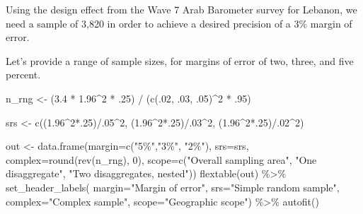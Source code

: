 \documentclass[
  letterpaper,
  DIV=11,
  numbers=noendperiod]{scrreprt}
\newenvironment{Shaded}{\begin{snugshade}}{\end{snugshade}}
\newcommand{\AttributeTok}[1]{\textcolor[rgb]{0.40,0.45,0.13}{#1}}
\newcommand{\DecValTok}[1]{\textcolor[rgb]{0.68,0.00,0.00}{#1}}
\newcommand{\FloatTok}[1]{\textcolor[rgb]{0.68,0.00,0.00}{#1}}
\newcommand{\FunctionTok}[1]{\textcolor[rgb]{0.28,0.35,0.67}{#1}}
\newcommand{\NormalTok}[1]{\textcolor[rgb]{0.00,0.23,0.31}{#1}}
\newcommand{\OtherTok}[1]{\textcolor[rgb]{0.00,0.23,0.31}{#1}}
\newcommand{\SpecialCharTok}[1]{\textcolor[rgb]{0.37,0.37,0.37}{#1}}
\newcommand{\StringTok}[1]{\textcolor[rgb]{0.13,0.47,0.30}{#1}}
\begin{document}
Using the design effect from the Wave 7 Arab Barometer survey for
Lebanon, we need a sample of 3,820 in order to achieve a desired
precision of a 3\% margin of error.

Let's provide a range of sample sizes, for margins of error of two,
three, and five percent.

\begin{Shaded}
\begin{Highlighting}[]
\NormalTok{n\_rng }\OtherTok{\textless{}{-}}\NormalTok{ (}\FloatTok{3.4} \SpecialCharTok{*} \FloatTok{1.96}\SpecialCharTok{\^{}}\DecValTok{2} \SpecialCharTok{*}\NormalTok{ .}\DecValTok{25}\NormalTok{) }\SpecialCharTok{/}\NormalTok{ (}\FunctionTok{c}\NormalTok{(.}\DecValTok{02}\NormalTok{, .}\DecValTok{03}\NormalTok{, .}\DecValTok{05}\NormalTok{)}\SpecialCharTok{\^{}}\DecValTok{2} \SpecialCharTok{*}\NormalTok{ .}\DecValTok{95}\NormalTok{)}

\NormalTok{srs }\OtherTok{\textless{}{-}} \FunctionTok{c}\NormalTok{((}\FloatTok{1.96}\SpecialCharTok{\^{}}\DecValTok{2}\SpecialCharTok{*}\NormalTok{.}\DecValTok{25}\NormalTok{)}\SpecialCharTok{/}\NormalTok{.}\DecValTok{05}\SpecialCharTok{\^{}}\DecValTok{2}\NormalTok{,}
\NormalTok{         (}\FloatTok{1.96}\SpecialCharTok{\^{}}\DecValTok{2}\SpecialCharTok{*}\NormalTok{.}\DecValTok{25}\NormalTok{)}\SpecialCharTok{/}\NormalTok{.}\DecValTok{03}\SpecialCharTok{\^{}}\DecValTok{2}\NormalTok{,}
\NormalTok{          (}\FloatTok{1.96}\SpecialCharTok{\^{}}\DecValTok{2}\SpecialCharTok{*}\NormalTok{.}\DecValTok{25}\NormalTok{)}\SpecialCharTok{/}\NormalTok{.}\DecValTok{02}\SpecialCharTok{\^{}}\DecValTok{2}\NormalTok{)}


\NormalTok{out }\OtherTok{\textless{}{-}} \FunctionTok{data.frame}\NormalTok{(}\AttributeTok{margin=}\FunctionTok{c}\NormalTok{(}\StringTok{"5\%"}\NormalTok{,}\StringTok{"3\%"}\NormalTok{, }\StringTok{"2\%"}\NormalTok{),}
                  \AttributeTok{srs=}\NormalTok{srs,}
                  \AttributeTok{complex=}\FunctionTok{round}\NormalTok{(}\FunctionTok{rev}\NormalTok{(n\_rng), }\DecValTok{0}\NormalTok{),}
                  \AttributeTok{scope=}\FunctionTok{c}\NormalTok{(}\StringTok{"Overall sampling area"}\NormalTok{, }\StringTok{"One disaggregate"}\NormalTok{, }\StringTok{"Two disaggregates, nested"}\NormalTok{))}
\FunctionTok{flextable}\NormalTok{(out) }\SpecialCharTok{\%\textgreater{}\%} 
  \FunctionTok{set\_header\_labels}\NormalTok{(}
                    \AttributeTok{margin=}\StringTok{"Margin of error"}\NormalTok{,}
                    \AttributeTok{srs=}\StringTok{"Simple random sample"}\NormalTok{,}
                    \AttributeTok{complex=}\StringTok{"Complex sample"}\NormalTok{,}
                    \AttributeTok{scope=}\StringTok{"Geographic scope"}\NormalTok{) }\SpecialCharTok{\%\textgreater{}\%}
  \FunctionTok{autofit}\NormalTok{() }
\end{Highlighting}
\end{Shaded}
\end{document}
